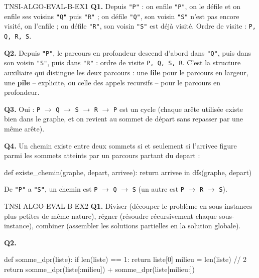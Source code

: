 \begin{corrige}{TNSI-ALGO-EVAL-B-EX1}
\textbf{Q1.} Depuis \texttt{"P"} : on enfile \texttt{"P"}, on le défile et on enfile ses voisins \texttt{"Q"} puis \texttt{"R"} ; on défile \texttt{"Q"}, son voisin \texttt{"S"} n'est pas encore visité, on l'enfile ; on défile \texttt{"R"}, son voisin \texttt{"S"} est déjà visité. Ordre de visite : \texttt{P, Q, R, S}.

\textbf{Q2.} Depuis \texttt{"P"}, le parcours en profondeur descend d'abord dans
\texttt{"Q"}, puis dans son voisin \texttt{"S"}, puis dans \texttt{"R"} : ordre de visite
\texttt{P, Q, S, R}. C'est la structure auxiliaire qui distingue les deux parcours : une
\textbf{file} pour le parcours en largeur, une \textbf{pile} -- explicite, ou celle des
appels recursifs -- pour le parcours en profondeur.

\textbf{Q3.} Oui : \texttt{P} $\to$ \texttt{Q} $\to$ \texttt{S} $\to$ \texttt{R} $\to$ \texttt{P} est un cycle (chaque arête utilisée existe bien dans le graphe, et on revient au sommet de départ sans repasser par une même arête).

\textbf{Q4.} Un chemin existe entre deux sommets si et seulement si l'arrivee figure parmi
les sommets atteints par un parcours partant du depart :

\begin{python}
def existe_chemin(graphe, depart, arrivee):
    return arrivee in dfs(graphe, depart)
\end{python}
De \texttt{"P"} a \texttt{"S"}, un chemin est \texttt{P} $\to$ \texttt{Q} $\to$ \texttt{S}
(un autre est \texttt{P} $\to$ \texttt{R} $\to$ \texttt{S}).
\end{corrige}

\begin{corrige}{TNSI-ALGO-EVAL-B-EX2}
\textbf{Q1.} Diviser (découper le problème en sous-instances plus petites de même nature), régner (résoudre récursivement chaque sous-instance), combiner (assembler les solutions partielles en la solution globale).

\textbf{Q2.}
\begin{python}
def somme_dpr(liste):
    if len(liste) == 1:
        return liste[0]
    milieu = len(liste) // 2
    return somme_dpr(liste[:milieu]) + somme_dpr(liste[milieu:])
\end{python}
\end{corrige}

